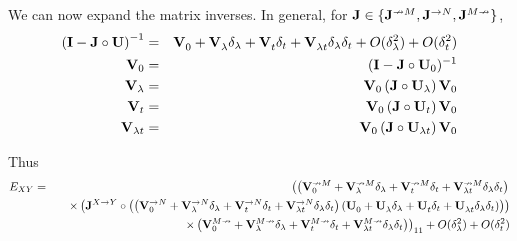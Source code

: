\documentclass{article}
\begin{document}
We can now expand the matrix inverses.
In general, for ${\bf J} \in \{ {\bf J}^{\nrightarrow M}, {\bf J}^{\rightarrow N}, {\bf J}^{M \nrightarrow} \}$,
\begin{eqnarray*}
  \left( {\bf I} - {\bf J} \circ {\bf U} \right)^{-1}
  & = & \vexpansion{} + O(\delta_\lambda^2) + O(\delta_t^2) \\
{\bf V}_0 & = & ({\bf I} - {\bf J} \circ {\bf U}_0)^{-1} \\
{\bf V}_\lambda & = & {\bf V}_0 \left( {\bf J} \circ {\bf U}_\lambda \right) {\bf V}_0 \\
{\bf V}_t & = & {\bf V}_0 \left( {\bf J} \circ {\bf U}_t \right) {\bf V}_0 \\
{\bf V}_{\lambda t} & = & {\bf V}_0 \left( {\bf J} \circ {\bf U}_{\lambda t} \right) {\bf V}_0
\end{eqnarray*}

Thus
\begin{eqnarray*}
E_{XY} & = &
\left(
\left( \vexpansion{\nrightarrow M} \right)
\right. \\ & & \quad \times
\left(
     {\bf J}^{X \to Y} \circ
     \left( \left( \vexpansion{\rightarrow N} \right)
     \left( \uexpansion \right) \right)
\right)
 \\ & & \quad \left. \times
 \left( \vexpansion{M \nrightarrow} \right)
\right)_{11}  + O(\delta_\lambda^2) + O(\delta_t^2)
\end{eqnarray*}
\end{document}
